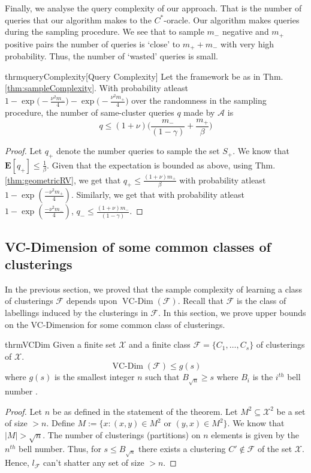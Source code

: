 \documentclass[12pt]{article}
\newcommand{\mb}{\mathbf}
\newcommand{\mc}{\mathcal}
\DeclareMathOperator*{\vcdim}{VC-Dim}
\begin{document}
Finally, we analyse the query complexity of our approach. That is the number of queries that our algorithm makes to the $C^*$-oracle. Our algorithm makes queries during the sampling procedure. We see that to sample $m_-$ negative and $m_+$ positive pairs the number of queries is `close' to $m_+ + m_-$ with very high probability. Thus, the number of `wasted' queries is small.  

\begin{restatable}{thrm}{queryComplexity}[Query Complexity]
\label{thm:queryComplexity}
Let the framework be as in Thm. \ref{thm:sampleComplexity}. With probability atleast $1-\exp\big(-\frac{\nu^2m_-}{4}) - \exp\big(-\frac{\nu^2m_+}{4}\big)$ over the randomness in the sampling procedure, the number of same-cluster queries $q$ made by $\mc A$ is  
$$q \le (1+\nu)\bigg(\frac{m_-}{(1-\gamma)} + \frac{m_+}{\beta}\bigg)$$
\end{restatable}
\begin{proof}
Let $q_+$ denote the number queries to sample the set $S_+$. We know that $\mb E[q_+] \le \frac{1}{\beta}$. Given that the expectation is bounded as above, using Thm. \ref{thm:geometricRV}, we get that $q_+ \le \frac{(1+\nu)m_+}{\beta}$ with probability atleast $1-\exp(\frac{-\nu^2m_+}{4})$. Similarly, we get that with probability atleast $1-\exp(\frac{-\nu^2m_-}{4})$, $q_- \le \frac{(1+\nu)m_-}{(1-\gamma)}$.
\end{proof}

\subsection{VC-Dimension of some common classes of clusterings}
In the previous section, we proved that the sample complexity of learning a class of clusterings $\mc F$ depends upon $\vcdim({\mc F})$. Recall that ${\mc F}$ is the class of labellings induced by the clusterings in $\mc F$. In this section, we prove upper bounds on the VC-Dimension for some common class of clusterings. 

\begin{restatable}{thrm}{VCDim}
Given a finite set $\mc X$ and a finite class $\mc F = \{C_1, \ldots, C_s\}$ of clusterings of $\mc X$.
$$\vcdim({\mc F}) \le g(s)$$ where $g(s)$ is the smallest integer $n$ such that $B_{\sqrt n} \ge s$ where $B_i$ is the $i^{th}$ bell number \cite{bell2010number}. 
\end{restatable}
\begin{proof}
Let $n$ be as defined in the statement of the theorem. Let $M^2 \subseteq \mc X^2$ be a set of size $> n$. Define $M := \{x: (x, y) \in M^2 \text{ or } (y, x) \in M^2\}$. We know that $|M| > \sqrt n$. The number of clusterings (partitions) on $n$ elements is given by the $n^{th}$ bell number. Thus, for $s \le B_{\sqrt n}$ there exists a clustering $C' \not\in \mc F$ of the set $\mc X$. Hence, $l_{\mc F}$ can't shatter any set of size $> n$.
\end{proof}
\end{document}
